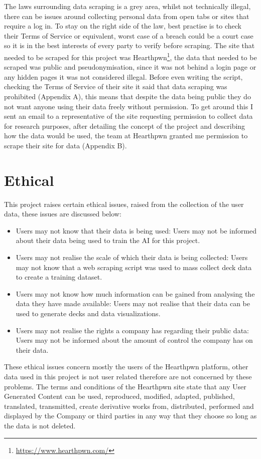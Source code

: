 \documentclass{report} %
\begin{document}
The laws surrounding data scraping is a grey area, whilst not technically illegal, there can be issues around collecting personal data from open tabs or sites that require a log in. To stay on the right side of the law, best practise is to check their Terms of Service or equivalent, worst case of a breach could be a court case so it is in the best interests of every party to verify before scraping. The site that needed to be scraped for this project was Hearthpwn\footnote{\url{https://www.hearthpwn.com/}}, the data that needed to be scraped was public and pseudonymisation, since it was not behind a login page or any hidden pages it was not considered illegal. Before even writing the script, checking the Terms of Service of their site it said that data scraping was prohibited (Appendix A), this means that despite the data being public they do not want anyone using their data freely without permission. To get around this I sent an email to a representative of the site requesting permission to collect data for research purposes, after detailing the concept of the project and describing how the data would be used, the team at Hearthpwn granted me permission to scrape their site for data (Appendix B). 
	
	
	
\section{Ethical} 
This project raises certain ethical issues, raised from the collection of the user data, these issues are discussed below:
\begin{itemize}
\item Users may not know that their data is being used: Users may not be informed about their data being used to train the AI for this project.
\item Users may not realise the scale of which their data is being collected: Users may not know that a web scraping script was used to mass collect deck data to create a training dataset.
\item Users may not know how much information can be gained from analysing the data they have made available: Users may not realise that their data can be used to generate decks and data visualizations.
\item Users may not realise the rights a company has regarding their public data: Users may not be informed about the amount of control the company has on their data.
\end{itemize}
These ethical issues concern mostly the users of the Hearthpwn platform, other data used in this project is not user related therefore are not concerned by these problems. The terms and conditions of the Hearthpwn site state that any User Generated Content can be used, reproduced, modified, adapted, published, translated, transmitted, create derivative works from, distributed, performed and displayed by the Company or third parties in any way that they choose so long as the data is not deleted. \\
\end{document}
